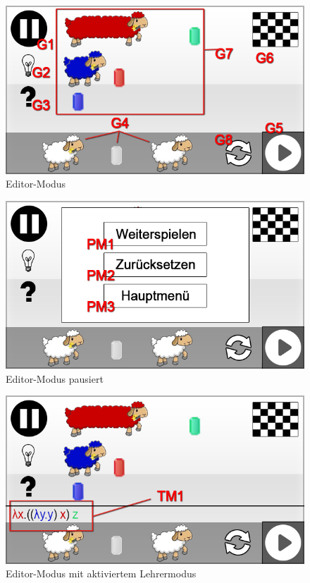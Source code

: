 \begin{figure}[H]
\centering
\includegraphics[scale=0.55]{../gui/_jpeg_numeration/game.jpg}
\caption{Editor-Modus}
\label{fig:Editor-Modus}
\end{figure}

\begin{figure}[H]
\centering
\includegraphics[scale=0.55]{../gui/_jpeg_numeration/game_paused.jpg}
\caption{Editor-Modus pausiert}
\label{fig:Editor-Modus_Paused}
\end{figure}

\begin{figure}[H]
\centering
\includegraphics[scale=0.55]{../gui/_jpeg_numeration/game_teachermode.jpg}
\caption{Editor-Modus mit aktiviertem Lehrermodus}
\label{fig:Editor-Modus_TM}
\end{figure}

